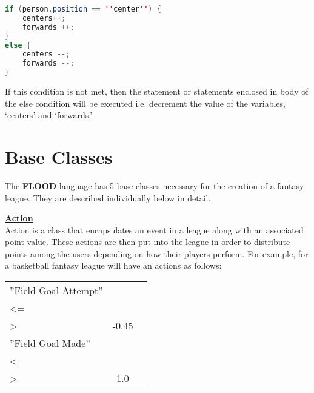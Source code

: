 \documentclass[12pt]{report}
\begin{document}
\begin{lstlisting}[language=Java,label=some-code,caption=While loop]
if (person.position == ''center'') {
	centers++;
	forwards ++;
}
else {
	centers --;
	forwards --;
}
\end{lstlisting}

\begin{doublespace}
If this condition is not met, then the statement or statements enclosed in body of the else condition will be executed i.e. decrement the value of the variables, `centers' and `forwards.'
\end{doublespace}

\section{Base Classes}

\begin{doublespace}
The \textbf{FLOOD} language has 5 base classes necessary for the creation of a fantasy league. They are described individually below in detail.
\end{doublespace}

\begin{doublespace}
\textbf{\underline{Action}}
\\
Action is a class that encapsulates an event in a league along with an associated point value. These actions are then put into the league in order to distribute points among the users depending on how their players perform. For example, for a basketball fantasy league will have an actions as follows:
\begin{center}
\begin{tabular}{ l c l }
''Field Goal Attempt'' & \\<=\\> & -0.45 \\
''Field Goal Made'' & \\<=\\> & 1.0
\end{tabular}
\end{center}
\end{doublespace}
\end{document}
